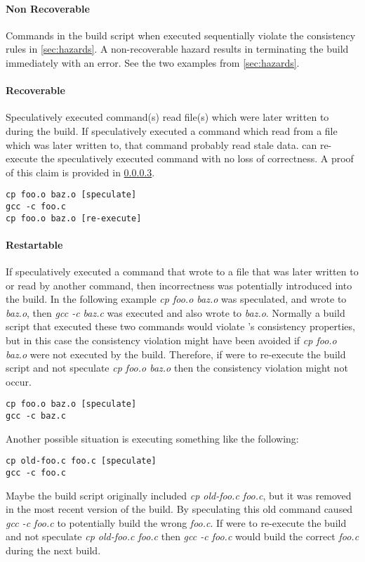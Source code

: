 \paragraph{Non Recoverable}
Commands in the build script when executed sequentially violate the consistency rules in \ref{sec:hazards}.  A non-recoverable hazard results in \Rattle terminating the build immediately with an error.  See the two examples from \ref{sec:hazards}.

\paragraph{Recoverable}
Speculatively executed command(s) read file(s) which were later written to during the build.  If \Rattle speculatively executed a command which read from a file which was later written to, that command
probably read stale data.  \Rattle can re-execute the speculatively executed command with no loss of correctness.  A proof of this claim is provided in \ref{}.

\begin{verbatim}
cp foo.o baz.o [speculate]
gcc -c foo.c
cp foo.o baz.o [re-execute]
\end{verbatim}

\paragraph{Restartable} %
If \Rattle speculatively executed a command that wrote to a file that was later written to or read by another command, then incorrectness was potentially introduced into the build.  In the following example \emph{cp foo.o baz.o} was speculated, and wrote to \emph{baz.o}, then \emph{gcc -c baz.c} was executed and also wrote to \emph{baz.o}.  Normally a build script that executed these two commands would violate \Rattle's consistency properties, but in this case the consistency violation might have been avoided if \emph{cp foo.o baz.o} were not executed by the build.  Therefore, if \Rattle were to re-execute the build script and not speculate \emph{cp foo.o baz.o} then the consistency violation might not occur.

\begin{verbatim}
cp foo.o baz.o [speculate]
gcc -c baz.c
\end{verbatim}

Another possible situation is \Rattle executing something like the following:

\begin{verbatim}
cp old-foo.c foo.c [speculate]
gcc -c foo.c
\end{verbatim}

Maybe the build script originally included \emph{cp old-foo.c foo.c}, but it was removed in the most recent version of the build.  By speculating this old command \Rattle caused \emph{gcc -c foo.c} to
potentially build the wrong \emph{foo.c}.  If \Rattle were to re-execute the build and not speculate \emph{cp old-foo.c foo.c} then \emph{gcc -c foo.c} would build the correct \emph{foo.c} during the next build.  %
